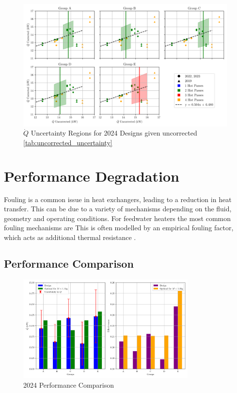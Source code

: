 \documentclass{article}
\begin{document}
\begin{figure}[H]
    \centering
    \includegraphics[width=0.99\textwidth]{Qdot_uncertainty_bands.png}
    \caption{$\dot{Q}$ Uncertainty Regions for 2024 Designs given uncorrected \ref{tab:uncorrected_uncertainty}}
    \label{fig:uncertainty_regions}
\end{figure}

\section{Performance Degradation}

Fouling is a common issue in heat exchangers, leading to a reduction in heat transfer.
This can be due to a variety of mechanisms depending on the fluid, geometry and operating conditions.
For feedwater heaters the most common fouling mechanisms are
This is often modelled by an empirical fouling factor, which acts as additional thermal resistance \cite{HeatTransfer}.

\subsection{Performance Comparison}


\begin{figure}[H]
    \centering
    \includegraphics[width=0.8\textwidth]{2024comparison.png}
    \caption{2024 Performance Comparison}
    \label{fig:2024_performance}
\end{figure}
\end{document}

